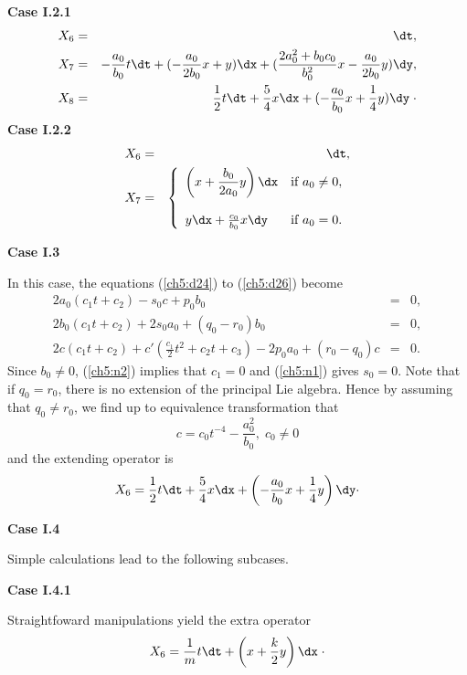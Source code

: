 {\bf Case I.2.1  }
\begin{eqnarray*}
X_6 &= & \dt , \\
X_7 & = & -\frac{a_0}{b_0}t\dt +(-\frac{a_0}{2b_0}x+y)\dx +
(\frac{2a_0^2+b_0c_0}{b_0^2}x-\frac{a_0}{2b_0}y)\dy,\\
X_8 &= & \frac{1}{2}t\dt+\frac{5}{4}x\dx +
(-\frac{a_0}{b_0}x+\frac{1}{4}y)\dy \;\cdot
\end{eqnarray*}
{\bf Case I.2.2   }
\begin{eqnarray*}
X_6 &= & \dt , \\
X_7 &= &\left \{ \begin{array}{ll}
                 \left ( x+\displaystyle{\frac{b_0}{2a_0}}y \right )\dx & \mbox{if }
                 a_0\ne 0, \\
                 &   \\
                 y\dx +\frac{c_0}{b_0}x\dy & \mbox{if } a_0=0.
                 \end{array}
                 \right.
\end{eqnarray*}

{\bf Case I.3 }

In this case, the equations (\ref{ch5:d24}) to (\ref{ch5:d26}) become
\begin{eqnarray}
2a_0(c_1t+c_2)-s_0c+p_0b_0 &=& 0, \label{ch5:n1}\\
2b_0(c_1t+c_2)+2s_0a_0+(q_0-r_0)b_0 &=& 0, \label{ch5:n2}\\
2c(c_1t+c_2)+c'(\frac{c_1}{2}t^2+c_2t+c_3)-2p_0a_0+(r_0-q_0)c &=& 0. \label{ch5:n3}
\end{eqnarray}
Since $b_0\ne0$, (\ref{ch5:n2}) implies that $c_1=0$ and (\ref{ch5:n1}) gives
$s_0=0$. Note that if $q_0=r_0$, there is no extension of the principal Lie
algebra. Hence by assuming that $q_0\ne r_0$, we find up to equivalence
transformation that
\[c=c_0t^{-4}-\frac{a_0^2}{b_0},\; c_0\ne 0\]
and the extending operator is
\[X_6=\frac{1}{2}t\dt +\frac{5}{4}x\dx+ \left (-\frac{a_0}{b_0}x+\frac{1}{4}y
\right )\dy \cdot\]

{\bf Case I.4 }

Simple calculations lead to the following subcases.

{\bf Case I.4.1 }

Straightfoward manipulations yield the extra operator
\[X_6=\frac{1}{m}t\dt+\left ( x+\frac{k}{2}y \right ) \dx \;\cdot \]

